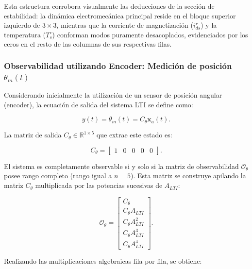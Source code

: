 \documentclass[10pt,a4paper]{article}
\begin{document}
Esta estructura corrobora visualmente las deducciones de la sección de estabilidad: la dinámica electromecánica principal reside en el bloque superior izquierdo de $3 \times 3$, mientras que la corriente de magnetización ($i_{ds}^r$) y la temperatura ($T_s^\circ$) conforman modos puramente desacoplados, evidenciados por los ceros en el resto de las columnas de sus respectivas filas.

\subsubsection{Observabilidad utilizando Encoder: Medición de posición $\theta_m(t)$}

Considerando inicialmente la utilización de un sensor de posición angular (encoder), la ecuación de salida del sistema LTI se define como:

\begin{equation}
    y(t) = \theta_m(t) = C_\theta \mathbf{x}_a(t).
\end{equation}

La matriz de salida $C_\theta \in \mathbb{R}^{1 \times 5}$ que extrae este estado es:

\begin{equation}
    C_\theta =
    \begin{bmatrix}
        1 & 0 & 0 & 0 & 0
    \end{bmatrix}.
\end{equation}

El sistema es completamente observable si y solo si la matriz de observabilidad $\mathcal{O}_\theta$ posee rango completo (rango igual a $n=5$). Esta matriz se construye apilando la matriz $C_\theta$ multiplicada por las potencias sucesivas de $A_{LTI}$:

\begin{equation*}
    \mathcal{O}_\theta=
    \begin{bmatrix}
        C_\theta\\[1mm]
        C_\theta A_{LTI}\\[1mm]
        C_\theta A_{LTI}^2\\[1mm]
        C_\theta A_{LTI}^3\\[1mm]
        C_\theta A_{LTI}^4
    \end{bmatrix}.
\end{equation*}

Realizando las multiplicaciones algebraicas fila por fila, se obtiene:
\end{document}
